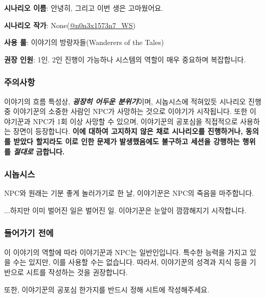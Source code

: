 \documentclass{report}
\begin{document}
	\textbf{시나리오 이름}: 안녕히, 그리고 이번 생은 고마웠어요.
	
	\textbf{시나리오 작가}: None(\href{https://www.twitter.com/n0n3x1573n7_WS}{@n0n3x1573n7\_WS})
	
	\textbf{사용 룰}: 이야기의 방랑자들(Wanderers of the Tales)
	
	\textbf{권장 인원}: 1인. 2인 진행이 가능하나 시스템의 역할이 매우 중요하며 복잡합니다.
	
	\subsubsection*{주의사항}
	
	이야기의 흐름 특성상, \emph{\textbf{굉장히 어두운 분위기}}이며, 시놉시스에 적혀있듯 시나리오 진행 중 이야기꾼의 소중한 사람인 NPC가 사망하는 것으로 이야기가 시작됩니다. 또한 이야기꾼과 NPC가 1회 이상 사망할 수 있으며, 이야기꾼의 공포심을 직접적으로 사용하는 장면이 등장합니다. \textbf{이에 대하여 고지하지 않은 채로 시나리오를 진행하거나, 동의를 받았다 할지라도 이로 인한 문제가 발생했음에도 불구하고 세션을 강행하는 행위를 \emph{절대로} 금합니다.}
	
	\subsubsection*{시놉시스}
	
	NPC와 원래는 기분 좋게 놀러가기로 한 날, 이야기꾼은 NPC의 죽음을 마주합니다.
	
	
	...하지만 이미 벌어진 일은 벌어진 일. 이야기꾼은 눈앞이 깜깜해지기 시작합니다.
	
	\subsubsection*{들어가기 전에}
	
	이 이야기의 역할에 따라 이야기꾼과 NPC는 일반인입니다. 특수한 능력을 가지고 있을 수는 있지만, 이를 사용할 수는 없습니다. 따라서, 이야기꾼의 성격과 지식 등을 기반으로 시트를 작성하는 것을 권장합니다.
	
	또한, 이야기꾼의 공포심 한가지를 반드시 정해 시트에 작성해주세요.
	
\end{document}

